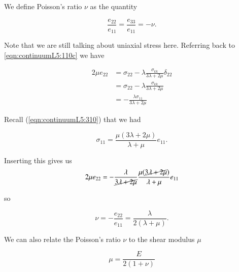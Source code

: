 We define Poisson's ratio $\nu$ as the quantity

\begin{equation}\label{eqn:continuumL5:350}
\frac{e_{22}}{e_{11}} = \frac{e_{33}}{e_{11}} = - \nu.
\end{equation}

Note that we are still talking about uniaxial stress here.  Referring back to \ref{eqn:continuumL5:110c} we have

\begin{align*}
2 \mu e_{2 2}
&= \sigma_{2 2} - \lambda \frac{\sigma_{k k}}{3 \lambda + 2 \mu} \delta_{2 2} \\
&= \sigma_{2 2} - \lambda \frac{\sigma_{k k}}{3 \lambda + 2 \mu} \\
&= - \frac{\lambda \sigma_{11}}{3 \lambda + 2 \mu}
\end{align*}

Recall (\ref{eqn:continuumL5:310}) that we had

\begin{equation}\label{eqn:continuumL5:370}
\sigma_{11} = \frac{\mu (3 \lambda + 2 \mu)}{\lambda + \mu} e_{11}.
\end{equation}

Inserting this gives us
\begin{align*}
2 \mu e_{22} 
= - \frac{\lambda}{\cancel{3 \lambda + 2 \mu}} \frac{ \mu (\cancel{3 \lambda + 2\mu})}{\lambda + \mu} e_{11}
\end{align*}

so

\begin{equation}\label{eqn:continuumL5:410}
\boxed{
\nu = -\frac{e_{22}}{e_{11}} = \frac{\lambda}{2 (\lambda + \mu)}.
}
\end{equation}

We can also relate the Poisson's ratio $\nu$ to the shear modulus $\mu$ 

\begin{equation}\label{eqn:continuumL5:430}
\mu = \frac{E}{2(1 + \nu)}
\end{equation}

